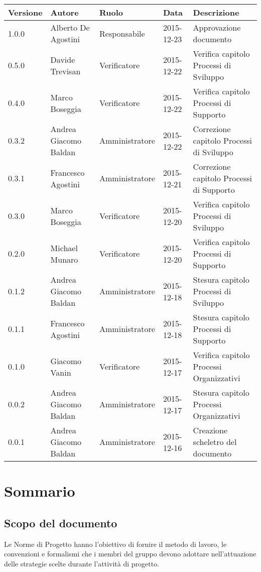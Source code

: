 \documentclass{scalatekids-article}
\begin{document}
\begin{center}
  \begin{tabular}{| l | l | l | l | l |}
    \hline
    Versione & Autore & Ruolo & Data & Descrizione \\
    \hline
    1.0.0 & Alberto De Agostini & Responsabile & 2015-12-23 & Approvazione documento\\
    \hline
    0.5.0 & Davide Trevisan & Verificatore & 2015-12-22 & Verifica capitolo Processi di Sviluppo\\
    \hline
    0.4.0 & Marco Boseggia & Verificatore & 2015-12-22 & Verifica capitolo Processi di Supporto\\
    \hline
    0.3.2 & Andrea Giacomo Baldan & Amministratore & 2015-12-22 & Correzione capitolo Processi di Sviluppo\\
    \hline
    0.3.1 & Francesco Agostini & Amministratore & 2015-12-21 & Correzione capitolo Processi di Supporto\\
    \hline
    0.3.0 & Marco Boseggia & Verificatore & 2015-12-20 & Verifica capitolo Processi di Sviluppo\\
    \hline
    0.2.0 & Michael Munaro & Verificatore & 2015-12-20 & Verifica capitolo Processi di Supporto\\
    \hline
    0.1.2 & Andrea Giacomo Baldan & Amministratore & 2015-12-18 & Stesura capitolo Processi di Sviluppo\\
    \hline
    0.1.1 & Francesco Agostini & Amministratore & 2015-12-18 & Stesura capitolo Processi di Supporto\\
    \hline
    0.1.0 & Giacomo Vanin & Verificatore & 2015-12-17 & Verifica capitolo Processi Organizzativi\\
    \hline
    0.0.2 & Andrea Giacomo Baldan & Amministratore & 2015-12-17 & Stesura capitolo Processi Organizzativi\\
    \hline
    0.0.1 & Andrea Giacomo Baldan & Amministratore & 2015-12-16 & Creazione scheletro del documento\\
    \hline
  \end{tabular}
\end{center}
\tableofcontents
\listoffigures
\section{Sommario}
\subsection{Scopo del documento}
Le Norme di Progetto hanno l'obiettivo di fornire il metodo di lavoro, le
convenzioni e formalismi che i membri del gruppo devono adottare nell'attuazione
delle strategie scelte durante l'attività di progetto.
\prodPurpose \glossExpl
\end{document}
